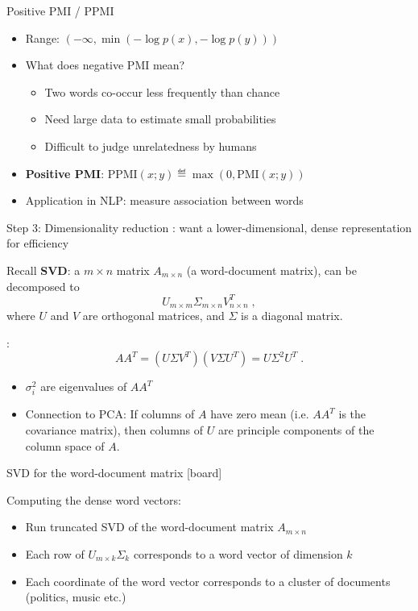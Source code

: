 \documentclass[usenames,dvipsnames,notes,11pt,aspectratio=169]{beamer}
\begin{document}
\begin{frame}
    {Positive PMI / PPMI}
    \begin{itemize}
        \itemsep1em
        \item Range: $(-\infty, \min(-\log p(x), -\log p(y)))$
        \item What does negative PMI mean?\pause
            \begin{itemize}
                \item Two words co-occur less frequently than chance
                \item Need large data to estimate small probabilities
                \item Difficult to judge unrelatedness by humans
            \end{itemize}
        \item {\bf Positive PMI}: $\text{PPMI}(x;y) \eqdef \max(0, \text{PMI}(x;y))$
        \item Application in NLP: measure association between words 
    \end{itemize}
\end{frame}


\begin{frame}
    {Step 3: Dimensionality reduction}
    : want a lower-dimensional, dense representation for efficiency
    \pause

    Recall \textbf{SVD}: a $m\times n$ matrix $A_{m\times n}$ (\eg a word-document matrix),
    can be decomposed to
    $$
    U_{m\times m}\Sigma_{m\times n}V_{n\times n}^T \;,
    $$
    where $U$ and $V$ are orthogonal matrices, and $\Sigma$ is a diagonal matrix.
    \pause

    :
    $$
    AA^T = (U\Sigma V^T)(V\Sigma U^T) = U\Sigma^2 U^T \;.
    $$
    \vspace{-1em}
    \begin{itemize}
        \item $\sigma_i^2$ are eigenvalues of $AA^T$ 
        \item Connection to PCA: If columns of $A$ have zero mean (i.e. $AA^T$ is the covariance matrix), then columns of $U$ are principle components of the column space of $A$.
    \end{itemize}
\end{frame}

\begin{frame}
    {SVD for the word-document matrix}
    {[board]}

    \pause
    Computing the dense word vectors:
    \begin{itemize}
        \item Run truncated SVD of the word-document matrix $A_{m\times n}$
        \item Each row of $U_{m\times k}\Sigma_k$ corresponds to a word vector of dimension $k$
        \item Each coordinate of the word vector corresponds to a cluster of documents (\eg politics, music etc.)
    \end{itemize}
\end{frame}
\end{document}
